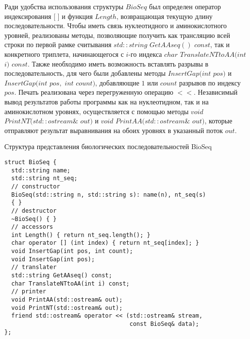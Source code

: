 Ради удобства использования структуры $BioSeq$ был определен оператор индексирования [ ] и функция $Length$, возвращающая текущую длину последовательности. Чтобы иметь связь нуклеотидного и аминокислотного уровней, реализованы методы, позволяющие получить как трансляцию всей строки по первой рамке считывания $std::string$ $GetAAseq()$ $const$, так и конкретного триплета, начинающегося с $i$-го индекса $char$ $TranslateNTtoAA(int$ $i)$ $const$. Также необходимо иметь возможность вставлять разрывы в последовательность, для чего были добавлены методы $InsertGap(int$ $pos)$ и $InsertGap(int$ $pos,$ $int$ $count)$, добавляющие $1$ или $count$ разрывов по индексу $pos$. Печать реализована через перегруженную операцию $<<$. Независимый вывод результатов работы программы как на нуклеотидном, так и на аминокислотном уровнях, осуществляется с помощью методы $void$ $PrintNT(std::ostream\&$ $out)$ и $void$ $PrintAA(std::ostream\&$ $out)$, которые отправляют результат выравнивания на обоих уровнях в указанный поток $out$.
\begin{algorithm}
	\caption{Структура представления биологических последовательностей BioSeq} \label{lst:BioSeq}
	\begin{lstlisting}
struct BioSeq {
  std::string name;
  std::string nt_seq;
  // constructor
  BioSeq(std::string n, std::string s): name(n), nt_seq(s) 
  { } 
  // destructor
  ~BioSeq() { }
  // accessors
  int Length() { return nt_seq.length(); }
  char operator [] (int index) { return nt_seq[index]; }
  void InsertGap(int pos, int count);
  void InsertGap(int pos);
  // translater
  std::string GetAAseq() const;
  char TranslateNTtoAA(int i) const;
  // printer
  void PrintAA(std::ostream& out);
  void PrintNT(std::ostream& out);
  friend std::ostream& operator << (std::ostream& stream,
                                    const BioSeq& data);
};
	\end{lstlisting}
\end{algorithm}

